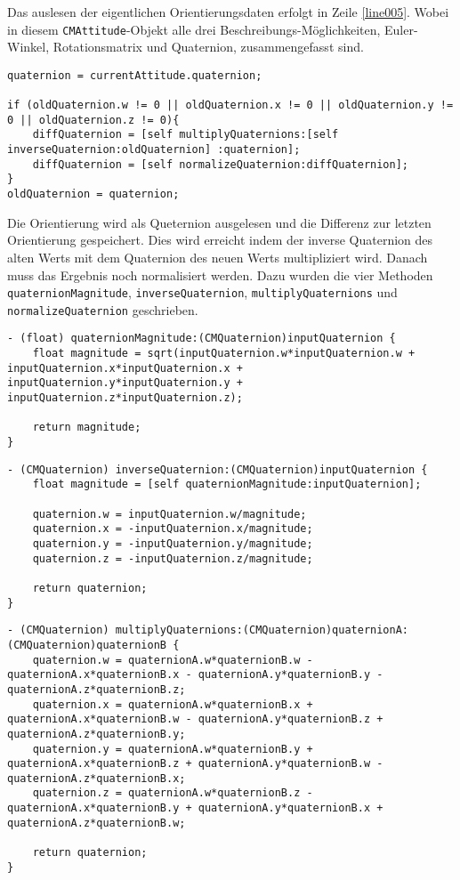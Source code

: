 Das auslesen der eigentlichen Orientierungsdaten erfolgt in Zeile \ref{line005}. Wobei in diesem \texttt{CMAttitude}-Objekt alle drei Beschreibungs-Möglichkeiten, Euler-Winkel, Rotationsmatrix und Quaternion, zusammengefasst sind.
~\\
\begin{lstlisting}[float=htb, caption=Azimut-Änderung berechnen]
quaternion = currentAttitude.quaternion;

if (oldQuaternion.w != 0 || oldQuaternion.x != 0 || oldQuaternion.y != 0 || oldQuaternion.z != 0){
	diffQuaternion = [self multiplyQuaternions:[self inverseQuaternion:oldQuaternion] :quaternion];
	diffQuaternion = [self normalizeQuaternion:diffQuaternion];
}            
oldQuaternion = quaternion;
\end{lstlisting}

Die Orientierung wird als Queternion ausgelesen und die Differenz zur letzten Orientierung gespeichert. Dies wird erreicht indem der inverse Quaternion des alten Werts mit dem Quaternion des neuen Werts multipliziert wird. Danach muss das Ergebnis noch normalisiert werden. Dazu wurden die vier Methoden \texttt{quaternionMagnitude}, \texttt{inverseQuaternion}, \texttt{multiplyQuaternions} und \texttt{normalizeQuaternion} geschrieben.
~\\
\begin{lstlisting}[float=htb, caption=Methode \texttt{quaternionMagnitude}]
- (float) quaternionMagnitude:(CMQuaternion)inputQuaternion {
	float magnitude = sqrt(inputQuaternion.w*inputQuaternion.w + inputQuaternion.x*inputQuaternion.x + inputQuaternion.y*inputQuaternion.y + inputQuaternion.z*inputQuaternion.z);
	
	return magnitude;
}
\end{lstlisting}


\begin{lstlisting}[float=htb, caption=Methode \texttt{inverseQuaternion}]
- (CMQuaternion) inverseQuaternion:(CMQuaternion)inputQuaternion {
	float magnitude = [self quaternionMagnitude:inputQuaternion];
	
	quaternion.w = inputQuaternion.w/magnitude;
	quaternion.x = -inputQuaternion.x/magnitude;
	quaternion.y = -inputQuaternion.y/magnitude;
	quaternion.z = -inputQuaternion.z/magnitude;
	
	return quaternion;
}
\end{lstlisting}

\begin{lstlisting}[float=htb, caption=Methode \texttt{multiplyQuaternions}]
- (CMQuaternion) multiplyQuaternions:(CMQuaternion)quaternionA:(CMQuaternion)quaternionB {
	quaternion.w = quaternionA.w*quaternionB.w - quaternionA.x*quaternionB.x - quaternionA.y*quaternionB.y - quaternionA.z*quaternionB.z;
	quaternion.x = quaternionA.w*quaternionB.x + quaternionA.x*quaternionB.w - quaternionA.y*quaternionB.z + quaternionA.z*quaternionB.y;
	quaternion.y = quaternionA.w*quaternionB.y + quaternionA.x*quaternionB.z + quaternionA.y*quaternionB.w - quaternionA.z*quaternionB.x;
	quaternion.z = quaternionA.w*quaternionB.z - quaternionA.x*quaternionB.y + quaternionA.y*quaternionB.x + quaternionA.z*quaternionB.w;

	return quaternion;
}
\end{lstlisting}

